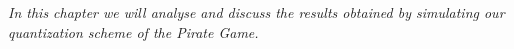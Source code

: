 \label{cap:chapter5}

\textit{In this chapter we will analyse and discuss the results obtained by simulating our quantization scheme of the Pirate Game.}




\cleardoublepage
